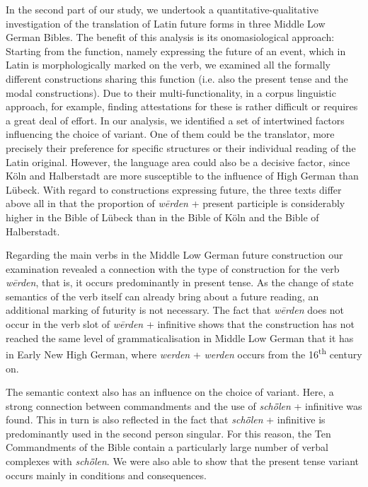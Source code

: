 \documentclass[output=paper,colorlinks,citecolor=brown]{langscibook}
\begin{document}
In the second part of our study, we undertook a quantitative-qualitative investigation of the translation of Latin future forms in three Middle Low German Bibles. The benefit of this analysis is its onomasiological approach: Starting from the function, namely expressing the future of an event, which in Latin is morphologically marked on the verb, we examined all the formally different constructions sharing this function (i.e. also the present tense and the modal constructions). Due to their multi-functionality, in a corpus linguistic approach, for example, finding attestations for these is rather difficult or requires a great deal of effort. In our analysis, we identified a set of intertwined factors influencing  the choice of variant. One of them could be the translator, more precisely their preference for specific structures or their individual reading of the Latin original. However, the language area could also be a decisive factor, since Köln and Halberstadt are more susceptible to the influence of High German than Lübeck. With regard to constructions expressing future, the three texts differ above all in that the proportion of \textit{wērden} + present participle is considerably higher in the Bible of Lübeck than in the Bible of Köln and the Bible of Halberstadt.

Regarding the main verbs in the Middle Low German future construction our examination revealed a connection with the type of construction for the verb \textit{wērden}, that is, it occurs predominantly in present tense. As the change of state semantics of the verb itself can already bring about a future reading, an additional marking of futurity is not necessary. The fact that \textit{wērden} does not occur in the verb slot of \textit{wērden} + infinitive shows that the construction has not reached the same level of grammaticalisation in Middle Low German that it has in Early New High German, where \textit{werden} + \textit{werden} occurs from the 16\textsuperscript{th} century on.

The semantic context also has an influence on the choice of variant. Here, a strong connection between commandments and the use of \textit{schȫlen} + infinitive was found. This in turn is also reflected in the fact that \textit{schȫlen} + infinitive is predominantly used in the second person singular. For this reason, the Ten Commandments of the Bible contain a particularly large number of verbal complexes with \textit{schȫlen}. We were also able to show that the present tense variant occurs mainly in conditions and consequences.
\end{document}
